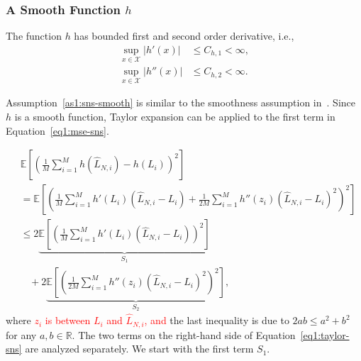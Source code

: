 \subsubsection*{A Smooth Function $h$}
\begin{assumption}\label{as1:sns-smooth}
    The function $h$ has bounded first and second order derivative, i.e.,
    \begin{align*}
        \sup_{x \in \mathcal{X}} |h'(x)|  & \leq C_{h, 1} < \infty, \\
        \sup_{x \in \mathcal{X}} |h''(x)| & \leq C_{h, 2} < \infty.
    \end{align*}
\end{assumption}

Assumption~\ref{as1:sns-smooth} is similar to the smoothness assumption in~\cite{wang2022smooth}.
Since $h$ is a smooth function, Taylor expansion can be applied to the first term in Equation~\eqref{eq1:mse-sns}.

\begin{align}\label{eq1:taylor-sns}
    & \mathbb{E} \left[  \left( \frac{1}{M} \sum_{i=1}^M h\left( \hat{L}_{N, i} \right) -  h\left(L_i \right)  \right)^2\right] \nonumber \\
    & = \mathbb{E} \left[ \left( \frac{1}{M} \sum_{i=1}^M h'\left( L_i \right) \left( \hat{L}_{N, i} - L_i \right) +  \frac{1}{2M} \sum_{i=1}^M h''\left( z_i \right) \left( \hat{L}_{N, i} - L_i \right)^2 \right)^2\right] \nonumber \\
    & \leq 2 \underbrace{\mathbb{E} \left[ \left( \frac{1}{M} \sum_{i=1}^M h'\left( L_i \right) \left( \hat{L}_{N, i}- L_i \right) \right)^2\right]}_{S_1} \nonumber \\
    & ~~~~ + 2 \underbrace{\mathbb{E} \left[ \left( \frac{1}{2M} \sum_{i=1}^M h''\left( z_i \right) \left( \hat{L}_{N, i} - L_i \right)^2 \right)^2\right]}_{S_2},
\end{align}
where \textcolor{red}{$z_i$ is between $L_i$ and $\hat{L}_{N,i}$, and} the last inequality is due to $2ab \leq a^2 + b^2$ for any $a, b \in \mathbb{R}$. 
The two terms on the right-hand side of Equation~\eqref{eq1:taylor-sns} are analyzed separately.
We start with the first term $S_1$.

